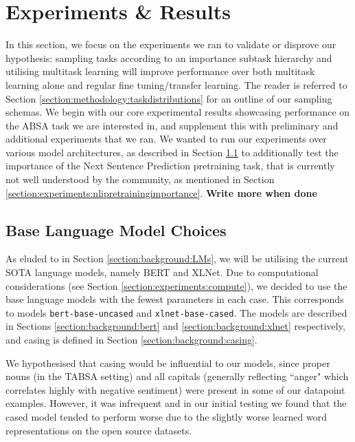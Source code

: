 
\chapter{Experiments \& Results} \label{chapter:experiments}

In this section, we focus on the experiments we ran to validate or disprove our hypothesis: sampling tasks according to an importance subtask hierarchy and utilising multitask learning will improve performance over both multitask learning alone and regular fine tuning/transfer learning. The reader is referred to Section \ref{section:methodology:taskdistributions} for an outline of our sampling schemas. We begin with our core experimental results showcasing performance on the ABSA task we are interested in, and supplement this with preliminary and additional experiments that we ran. We wanted to run our experiments over various model architectures, as described in Section \ref{section:experiments:languagemodels} to additionally test the importance of the Next Sentence Prediction pretraining task, that is currently not well understood by the community, as mentioned in Section \ref{section:experiments:nlipretrainingimportance}. \textbf{Write more when done}

\section{Base Language Model Choices} \label{section:experiments:languagemodels}
As eluded to in Section \ref{section:background:LMs}, we will be utilising the current SOTA language models, namely BERT and XLNet. Due to computational considerations (see Section \ref{section:experiments:compute}), we decided to use the base language models with the fewest parameters in each case. This corresponds to models \texttt{bert-base-uncased} and \texttt{xlnet-base-cased}. The models are described in Sections \ref{section:background:bert} and \ref{section:background:xlnet} respectively, and casing is defined in Section \ref{section:background:casing}.

We hypothesised that casing would be influential to our models, since proper nouns (in the TABSA setting) and all capitals (generally reflecting ``anger" which correlates highly with negative sentiment) were present in some of our datapoint examples. However, it was infrequent and in our initial testing we found that the cased model tended to perform worse due to the slightly worse learned word representations on the open source datasets.

